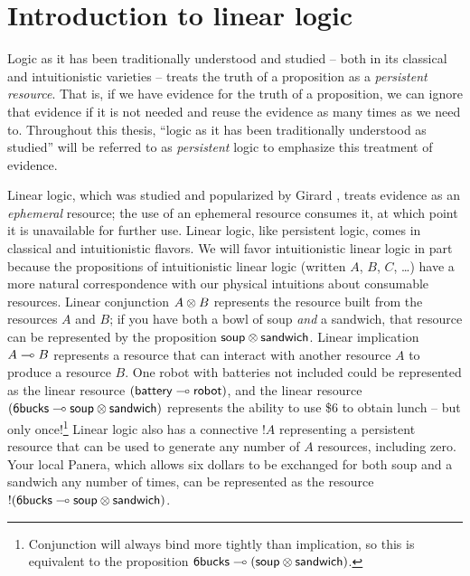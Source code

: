 

\section{Introduction to linear logic}
\label{sec:introlinlog}

Logic as it has been traditionally understood and studied -- both in
its classical and intuitionistic varieties -- treats the truth of a
proposition as a {\it persistent resource}. That is, if we have
evidence for the truth of a proposition, we can ignore that evidence
if it is not needed and reuse the evidence as many times as we need
to. Throughout this thesis, ``logic as it has been traditionally
understood as studied'' will be referred to as {\it persistent} logic
to emphasize this treatment of evidence. 

Linear logic, which was studied and popularized by Girard
\cite{girard87linear}, treats evidence as an {\it ephemeral} resource;
the use of an ephemeral resource consumes it, at which point it is
unavailable for further use.  Linear logic, like persistent logic,
comes in classical and intuitionistic flavors. We will favor
intuitionistic linear logic in part because the propositions of
intuitionistic linear logic (written $A$, $B$, $C$, \ldots) have a
more natural correspondence with our physical intuitions about
consumable resources. Linear conjunction $A \otimes B$ represents the
resource built from the resources $A$ and $B$; if you have both a bowl
of soup {\it and} a sandwich, that resource can be represented by the
proposition ${\sf soup} \otimes {\sf sandwich}$. Linear implication $A
\multimap B$ represents a resource that can interact with another
resource $A$ to produce a resource $B$. One robot with batteries not
included could be represented as the linear resource $({\sf battery}
\multimap {\sf robot})$, and the linear resource $({\sf 6bucks} \multimap
{\sf soup} \otimes {\sf sandwich})$ represents the ability to use \$6
to obtain lunch -- but only once!\footnote{Conjunction will always
  bind more tightly than implication, so this is equivalent to the
  proposition ${\sf 6bucks} \multimap ({\sf soup} \otimes {\sf
    sandwich})$.} Linear logic also has a connective ${!}A$
representing a persistent resource that can be used to generate any
number of $A$ resources, including zero. Your local Panera, which
allows six dollars to be exchanged for both soup and a sandwich any number
of times, can be represented as the resource
${!}({\sf 6bucks} \multimap {\sf soup} \otimes {\sf sandwich})$. 

